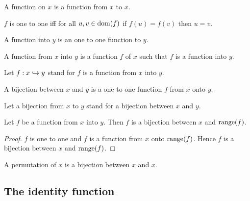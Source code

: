 \documentclass[../../sets-and-functions.ftl.tex]{subfiles}
\begin{document}
\begin{forthel}
    \begin{definition}
      A function on $x$ is a function from $x$ to $x$.
    \end{definition}

    \begin{definition}
      $f$ is one to one iff for all $u,v \in \operatorname{dom}(f)$ if $f(u) = f(v)$ then $u = v$.
    \end{definition}

    \begin{definition}
      A function into $y$ is an one to one function to $y$.
    \end{definition}

    \begin{definition}
      A function from $x$ into $y$ is a function $f$ of $x$ such that $f$ is a function into $y$.
    \end{definition}

    Let $f: x \hookrightarrow y$ stand for $f$ is a function from $x$ into $y$.

    \begin{definition}
      A bijection between $x$ and $y$ is a one to one function $f$ from $x$ onto $y$.
    \end{definition}

    Let a bijection from $x$ to $y$ stand for a bijection between $x$ and $y$.

    \begin{proposition}[SF 02 01 717927]
      Let $f$ be a function from $x$ into $y$.
      Then $f$ is a bijection between $x$ and $\operatorname{range}(f)$.
    \end{proposition}
    \begin{proof}
      $f$ is one to one and $f$ is a function from $x$ onto $\operatorname{range}(f)$.
      Hence $f$ is a bijection between $x$ and $\operatorname{range}(f)$.
    \end{proof}

    \begin{definition}
      A permutation of $x$ is a bijection between $x$ and $x$.
    \end{definition}
  \end{forthel}


  \subsection{The identity function}
\end{document}
